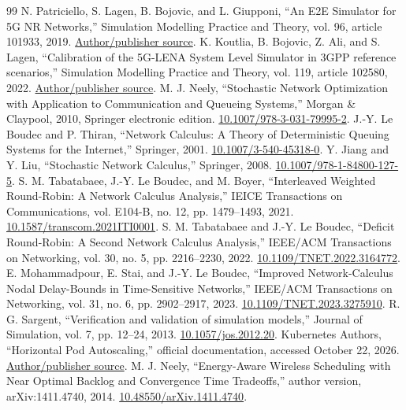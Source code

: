 \documentclass{IEEEoj}
\begin{document}
\begin{thebibliography}{99}
 N. Patriciello, S. Lagen, B. Bojovic, and L. Giupponi, ``An E2E Simulator for 5G NR Networks,'' Simulation Modelling Practice and Theory, vol. 96, article 101933, 2019. \href{https://5g-lena.cttc.es/papers/}{Author/publisher source}.
 K. Koutlia, B. Bojovic, Z. Ali, and S. Lagen, ``Calibration of the 5G-LENA System Level Simulator in 3GPP reference scenarios,'' Simulation Modelling Practice and Theory, vol. 119, article 102580, 2022. \href{https://5g-lena.cttc.es/features/calibration/}{Author/publisher source}.
 M. J. Neely, ``Stochastic Network Optimization with Application to Communication and Queueing Systems,'' Morgan \& Claypool, 2010, Springer electronic edition. \href{https://doi.org/10.1007/978-3-031-79995-2}{10.1007/978-3-031-79995-2}.
 J.-Y. Le Boudec and P. Thiran, ``Network Calculus: A Theory of Deterministic Queuing Systems for the Internet,'' Springer, 2001. \href{https://doi.org/10.1007/3-540-45318-0}{10.1007/3-540-45318-0}.
 Y. Jiang and Y. Liu, ``Stochastic Network Calculus,'' Springer, 2008. \href{https://doi.org/10.1007/978-1-84800-127-5}{10.1007/978-1-84800-127-5}.
 S. M. Tabatabaee, J.-Y. Le Boudec, and M. Boyer, ``Interleaved Weighted Round-Robin: A Network Calculus Analysis,'' IEICE Transactions on Communications, vol. E104-B, no. 12, pp. 1479--1493, 2021. \href{https://doi.org/10.1587/transcom.2021ITI0001}{10.1587/transcom.2021ITI0001}.
 S. M. Tabatabaee and J.-Y. Le Boudec, ``Deficit Round-Robin: A Second Network Calculus Analysis,'' IEEE/ACM Transactions on Networking, vol. 30, no. 5, pp. 2216--2230, 2022. \href{https://doi.org/10.1109/TNET.2022.3164772}{10.1109/TNET.2022.3164772}.
 E. Mohammadpour, E. Stai, and J.-Y. Le Boudec, ``Improved Network-Calculus Nodal Delay-Bounds in Time-Sensitive Networks,'' IEEE/ACM Transactions on Networking, vol. 31, no. 6, pp. 2902--2917, 2023. \href{https://doi.org/10.1109/TNET.2023.3275910}{10.1109/TNET.2023.3275910}.
 R. G. Sargent, ``Verification and validation of simulation models,'' Journal of Simulation, vol. 7, pp. 12--24, 2013. \href{https://doi.org/10.1057/jos.2012.20}{10.1057/jos.2012.20}.
 Kubernetes Authors, ``Horizontal Pod Autoscaling,'' official documentation, accessed October 22, 2026. \href{https://kubernetes.io/docs/concepts/workloads/autoscaling/horizontal-pod-autoscale/}{Author/publisher source}.
 M. J. Neely, ``Energy-Aware Wireless Scheduling with Near Optimal Backlog and Convergence Time Tradeoffs,'' author version, arXiv:1411.4740, 2014. \href{https://doi.org/10.48550/arXiv.1411.4740}{10.48550/arXiv.1411.4740}.

\end{thebibliography}
\end{document}
